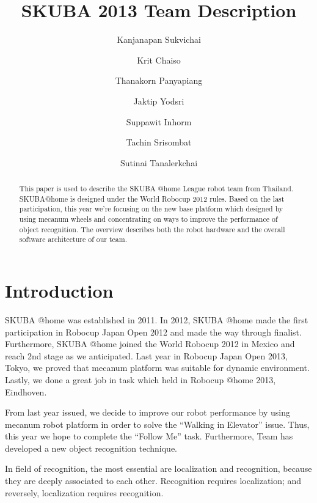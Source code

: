\documentclass{llncs}
\newcommand{\dq}[1]{``#1''}
\begin{document}
\title{SKUBA 2013 Team Description}
\author{Kanjanapan Sukvichai
\and Krit Chaiso
\and Thanakorn Panyapiang
\and Jaktip Yodsri
\and Suppawit Inhorm
\and Tachin Srisombat
\and Sutinai Tanalerkchai
}


\maketitle

\begin{abstract}
This paper is used to describe the SKUBA @home League robot team from Thailand.
SKUBA@home is designed under the World Robocup 2012 rules. 
Based on the last participation, this year we're focusing on the new base platform which designed by using mecanum wheels and concentrating on ways to improve the performance of object recognition.
The overview describes both the robot hardware and the overall software architecture of our team.
\end{abstract}

\section{Introduction}
SKUBA @home was established in 2011. In 2012, SKUBA @home made the first participation in Robocup Japan Open 2012 and made the way through finalist. Furthermore, SKUBA @home joined the World Robocup 2012 in Mexico and reach 2nd stage as we anticipated. Last year in Robocup Japan Open 2013, Tokyo, we proved that mecanum platform was suitable for dynamic environment. Lastly, we done a great job in  task which held in Robocup @home 2013, Eindhoven.

From last year issued, we decide to improve our robot performance by using mecanum robot platform in order to solve the \dq{Walking in Elevator} issue. Thus, this year we hope to complete the \dq{Follow Me} task. Furthermore, Team has developed a new object recognition technique.

In field of recognition, the most essential are localization and recognition, because they are deeply associated to each other. Recognition requires localization; and reversely, localization requires recognition.
\end{document}
